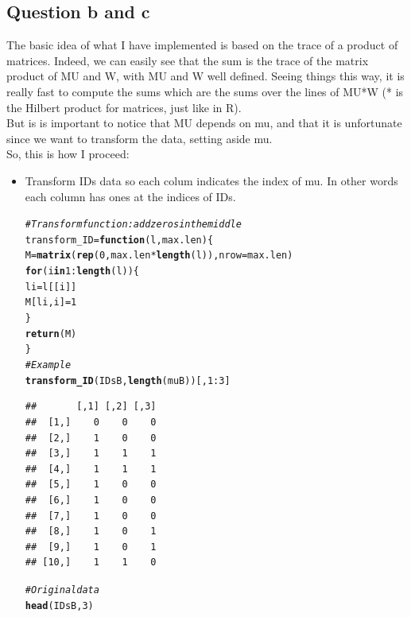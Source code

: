 \documentclass{llncs}\usepackage[]{graphicx}\usepackage[]{color}
\makeatletter
\newcommand{\hlnum}[1]{\textcolor[rgb]{0.686,0.059,0.569}{#1}}%
\newcommand{\hlcom}[1]{\textcolor[rgb]{0.678,0.584,0.686}{\textit{#1}}}%
\newcommand{\hlopt}[1]{\textcolor[rgb]{0,0,0}{#1}}%
\newcommand{\hlstd}[1]{\textcolor[rgb]{0.345,0.345,0.345}{#1}}%
\newcommand{\hlkwa}[1]{\textcolor[rgb]{0.161,0.373,0.58}{\textbf{#1}}}%
\newcommand{\hlkwb}[1]{\textcolor[rgb]{0.69,0.353,0.396}{#1}}%
\newcommand{\hlkwc}[1]{\textcolor[rgb]{0.333,0.667,0.333}{#1}}%
\newcommand{\hlkwd}[1]{\textcolor[rgb]{0.737,0.353,0.396}{\textbf{#1}}}%
\newenvironment{kframe}{%
 \def\at@end@of@kframe{}%
 \ifinner\ifhmode%
  \def\at@end@of@kframe{\end{minipage}}%
  \begin{minipage}{\columnwidth}%
 \fi\fi%
 \def\FrameCommand##1{\hskip\@totalleftmargin \hskip-\fboxsep
 \colorbox{shadecolor}{##1}\hskip-\fboxsep
     \hskip-\linewidth \hskip-\@totalleftmargin \hskip\columnwidth}%
 \MakeFramed {\advance\hsize-\width
   \@totalleftmargin\z@ \linewidth\hsize
   \@setminipage}}%
 {\par\unskip\endMakeFramed%
 \at@end@of@kframe}
\newenvironment{knitrout}{}{} %
\makeatother
\begin{document}
\subsection{Question b and c}
The basic idea of what I have implemented is based on the trace of a product of matrices. Indeed, we can easily see that the sum is the trace of the matrix product of MU and W, with MU and W well defined. Seeing things this way, it is really fast to compute the sums which are the sums over the lines of MU*W (* is the Hilbert product for matrices, just like in R). \\
But is is important to notice that MU depends on mu, and that it is unfortunate since we want to transform the data, setting aside mu. \\
So, this is how I proceed:
\begin {itemize}
\item Transform IDs data so each colum indicates the index of mu. In other words each column has ones at the indices of IDs.
\begin{knitrout}
\color{fgcolor}\begin{kframe}
\begin{alltt}
\hlcom{# Transform function : add zeros in the middle}
\hlstd{transform_ID} \hlkwb{=} \hlkwa{function}\hlstd{(}\hlkwc{l}\hlstd{,}\hlkwc{max.len}\hlstd{)\{}
  \hlstd{M}\hlkwb{=}\hlkwd{matrix}\hlstd{(}\hlkwd{rep}\hlstd{(}\hlnum{0}\hlstd{,max.len}\hlopt{*}\hlkwd{length}\hlstd{(l)),}\hlkwc{nrow}\hlstd{=max.len)}
  \hlkwa{for} \hlstd{(i} \hlkwa{in} \hlnum{1}\hlopt{:}\hlkwd{length}\hlstd{(l))\{}
    \hlstd{li}\hlkwb{=}\hlstd{l[[i]]}
    \hlstd{M[li,i]}\hlkwb{=}\hlnum{1}
  \hlstd{\}}
  \hlkwd{return}\hlstd{(M)}
\hlstd{\}}
\hlcom{# Example}
\hlkwd{transform_ID}\hlstd{(IDsB,}\hlkwd{length}\hlstd{(muB))[,}\hlnum{1}\hlopt{:}\hlnum{3}\hlstd{]}
\end{alltt}
\begin{lstlisting}[basicstyle=\ttfamily,breaklines=true]
##       [,1] [,2] [,3]
##  [1,]    0    0    0
##  [2,]    1    0    0
##  [3,]    1    1    1
##  [4,]    1    1    1
##  [5,]    1    0    0
##  [6,]    1    0    0
##  [7,]    1    0    0
##  [8,]    1    0    1
##  [9,]    1    0    1
## [10,]    1    1    0
\end{lstlisting}
\begin{alltt}
\hlcom{# Original data}
\hlkwd{head}\hlstd{(IDsB,}\hlnum{3}\hlstd{)}
\end{alltt}
\begin{lstlisting}[basicstyle=\ttfamily,breaklines=true]

\end{lstlisting}
\end{kframe}
\end{knitrout}
\end{itemize}
\end{document}
